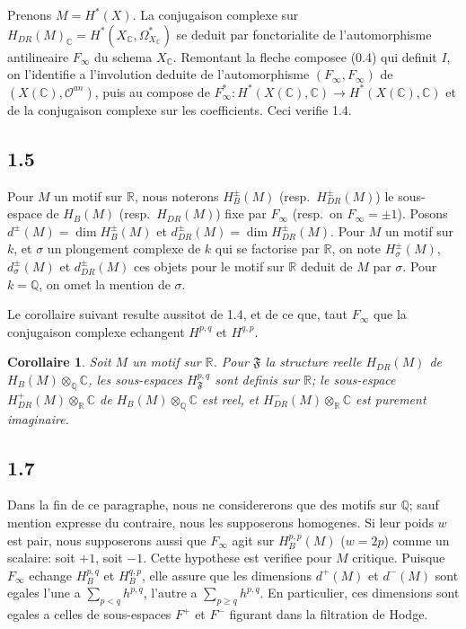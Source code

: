 \documentclass[12pt,a4paper]{article}
\theoremstyle{plain}
\newtheorem{corollary}[theorem]{Corollaire}
\theoremstyle{definition}
\theoremstyle{remark}
\newcommand{\Q}{\mathbb{Q}}
\newcommand{\R}{\mathbb{R}}
\newcommand{\C}{\mathbb{C}}
\begin{document}
Prenons $M = H^*(X)$. La conjugaison complexe sur $H_{DR}(M)_\C = H^*(X_\C, \Omega^*_{X_\C})$
se deduit par fonctorialite de l'automorphisme antilineaire $F_\infty$ du schema $X_\C$.
Remontant la fleche composee (0.4) qui definit $I$, on l'identifie a l'involution deduite
de l'automorphisme $(F_\infty, F_\infty)$ de $(X(\C), \mathcal{O}^{an})$, puis au compose de
$F_\infty^*: H^*(X(\C), \C) \to H^*(X(\C), \C)$ et de la conjugaison complexe sur les coefficients.
Ceci verifie 1.4.

\subsection*{1.5}

Pour $M$ un motif sur $\R$, nous noterons $H^\pm_B(M)$ (resp.~$H^\pm_{DR}(M)$) le sous-espace
de $H_B(M)$ (resp.~$H_{DR}(M)$) fixe par $F_\infty$ (resp.~on $F_\infty = \pm 1$). Posons
$d^\pm(M) = \dim H^\pm_B(M)$ et $d^\pm_{DR}(M) = \dim H^\pm_{DR}(M)$. Pour $M$ un motif sur $k$,
et $\sigma$ un plongement complexe de $k$ qui se factorise par $\R$, on note $H^\pm_\sigma(M)$,
$d^\pm_\sigma(M)$ et $d^\pm_{DR}(M)$ ces objets pour le motif sur $\R$ deduit de $M$ par $\sigma$.
Pour $k = \Q$, on omet la mention de $\sigma$.

Le corollaire suivant resulte aussitot de 1.4, et de ce que, taut $F_\infty$ que la conjugaison
complexe echangent $H^{p,q}$ et $H^{q,p}$.

\begin{corollary}\label{cor:1.6}
Soit $M$ un motif sur $\R$. Pour $\mathfrak{F}$ la structure reelle $H_{DR}(M)$ de
$H_B(M) \otimes_\Q \C$, les sous-espaces $H^{p,q}_\mathfrak{F}$ sont definis sur $\R$; le sous-espace
$H^+_{DR}(M) \otimes_\R \C$ de $H_B(M) \otimes_\Q \C$ est reel, et $H^-_{DR}(M) \otimes_\R \C$ est
purement imaginaire.
\end{corollary}

\subsection*{1.7}

Dans la fin de ce paragraphe, nous ne considererons que des motifs sur $\Q$;
sauf mention expresse du contraire, nous les supposerons homogenes. Si leur poids
$w$ est pair, nous supposerons aussi que $F_\infty$ agit sur $H^{p,p}_B(M)$ ($w = 2p$) comme un
scalaire: soit $+1$, soit $-1$. Cette hypothese est verifiee pour $M$ critique. Puisque
$F_\infty$ echange $H^{p,q}_B$ et $H^{q,p}_B$, elle assure que les dimensions $d^+(M)$ et $d^-(M)$
sont egales l'une a $\sum_{p < q} h^{p,q}$, l'autre a $\sum_{p \geq q} h^{p,q}$. En particulier, ces dimensions
sont egales a celles de sous-espaces $F^+$ et $F^-$ figurant dans la filtration de Hodge.
\end{document}
